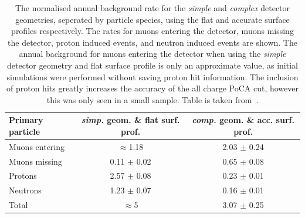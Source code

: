 \begin{table}
  \caption[The normalised annual background rate for the \emph{simple} detector geometry and flat surface profile, and for the \emph{complex} geometry and accurate surface profile]
          {The normalised annual background rate for the \emph{simple} and \emph{complex} detector geometries, seperated by particle species, using the flat and accurate surface profiles respectively. The rates for muons entering the detector, muons missing the detector, proton induced events, and neutron induced events are shown. The annual background for muons entering the detector when using the \emph{simple} detector geometry and flat surface profile is only an approximate value, as initial simulations were performed without saving proton hit information. The inclusion of proton hits greatly increases the accuracy of the all charge PoCA cut, however this was only seen in a small sample. Table is taken from~\citep{MartinsThesis}.}
  \centering
  \label{tab:FinalSurfRates}
  \begin{tabular}{l c c}
    \toprule
        {Primary particle} & {\emph{simp.} geom. \& flat surf. prof.} & {\emph{comp.} geom. \& acc. surf. prof.} \\ 
        \midrule
        Muons entering     & $\approx$1.18     & 2.03 $\pm$ 0.24 \\

        Muons missing      & 0.11 $\pm$ 0.02   & 0.65 $\pm$ 0.08 \\

        Protons            & 2.57 $\pm$ 0.08   & 0.23 $\pm$ 0.01 \\

        Neutrons           & 1.23 $\pm$ 0.07   & 0.16 $\pm$ 0.01 \\

        Total              & $\approx$5        & 3.07 $\pm$ 0.25 \\
    \bottomrule
  \end{tabular}
\end{table}


